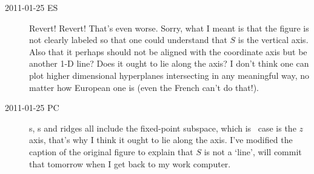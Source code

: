 \begin{description}
\item[2011-01-25 ES] Revert! Revert! That's even worse. Sorry, what I meant is that the
figure is not clearly labeled so that one could understand that $S$ is the
vertical axis. Also that it perhaps should not be aligned with the coordinate
axis but be another 1-D line? Does it ought to lie along the axis? I don't
think one can plot higher dimensional hyperplanes intersecting in any
meaningful way, no matter how European one is (even the French can't do that!).


\item[2011-01-25 PC] \Slice s, \sset s and ridges all include the
fixed-point subspace, which is \cLe\ case is the $z$ axis, that's why I
think it ought to lie along the axis. I've modified the caption of the
original figure to explain that $S$ is not a `line', will commit that
tomorrow when I get back to my work computer.

\end{description}
